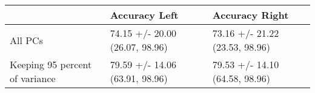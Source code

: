 \begin{tabular}{lll}
\toprule
{} &                   Accuracy Left &                  Accuracy Right \\
\midrule
All PCs                        &  74.15 +/- 20.00 (26.07, 98.96) &  73.16 +/- 21.22 (23.53, 98.96) \\
Keeping 95 percent of variance &  79.59 +/- 14.06 (63.91, 98.96) &  79.53 +/- 14.10 (64.58, 98.96) \\
\bottomrule
\end{tabular}
